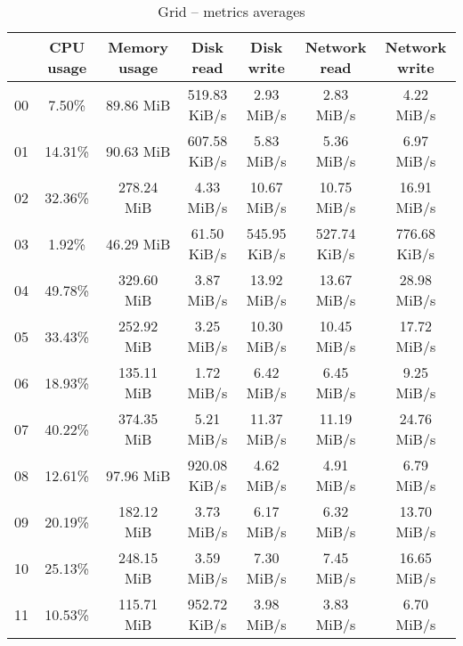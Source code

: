 \begin{table}[H]
\begin{center}
\caption{Grid -- metrics averages}
\label{tab:grid-avg}
\begin{tabular}{|c|c|c|c|c|c|c|}
\hline
   & CPU usage & Memory usage & Disk read & Disk write & Network read & Network write\\
\hline
00 & 7.50\% & 89.86 MiB & 519.83 KiB/s & 2.93 MiB/s & 2.83 MiB/s & 4.22 MiB/s\\
01 & 14.31\% & 90.63 MiB & 607.58 KiB/s & 5.83 MiB/s & 5.36 MiB/s & 6.97 MiB/s\\
02 & 32.36\% & 278.24 MiB & 4.33 MiB/s & 10.67 MiB/s & 10.75 MiB/s & 16.91 MiB/s\\
03 & 1.92\% & 46.29 MiB & 61.50 KiB/s & 545.95 KiB/s & 527.74 KiB/s & 776.68 KiB/s\\
04 & 49.78\% & 329.60 MiB & 3.87 MiB/s & 13.92 MiB/s & 13.67 MiB/s & 28.98 MiB/s\\
05 & 33.43\% & 252.92 MiB & 3.25 MiB/s & 10.30 MiB/s & 10.45 MiB/s & 17.72 MiB/s\\
06 & 18.93\% & 135.11 MiB & 1.72 MiB/s & 6.42 MiB/s & 6.45 MiB/s & 9.25 MiB/s\\
07 & 40.22\% & 374.35 MiB & 5.21 MiB/s & 11.37 MiB/s & 11.19 MiB/s & 24.76 MiB/s\\
08 & 12.61\% & 97.96 MiB & 920.08 KiB/s & 4.62 MiB/s & 4.91 MiB/s & 6.79 MiB/s\\
09 & 20.19\% & 182.12 MiB & 3.73 MiB/s & 6.17 MiB/s & 6.32 MiB/s & 13.70 MiB/s\\
10 & 25.13\% & 248.15 MiB & 3.59 MiB/s & 7.30 MiB/s & 7.45 MiB/s & 16.65 MiB/s\\
11 & 10.53\% & 115.71 MiB & 952.72 KiB/s & 3.98 MiB/s & 3.83 MiB/s & 6.70 MiB/s\\
\hline
\end{tabular}
\end{center}
\end{table}
